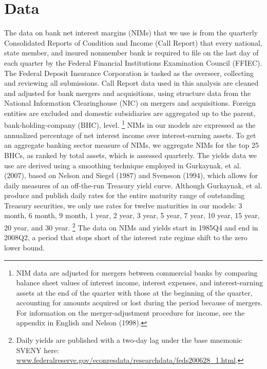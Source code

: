 \documentclass[12pt]{article}
\begin{document}
\section{Data}
The data on bank net interest margins (NIMs) that we use is from the quarterly Consolidated Reports of Condition and Income (Call Report) that every national, state member, and insured nonmember bank is required to file on the last day of each quarter by the Federal Financial Institutions Examination Council (FFIEC). The Federal Deposit Insurance Corporation is tasked as the overseer, collecting and reviewing all submissions. Call Report data used in this analysis are cleaned and adjusted for bank mergers and acquisitions, using structure data from the National Information Clearinghouse (NIC) on mergers and acquisitions. Foreign entities are excluded and domestic subsidiaries are aggregated up to the parent, bank-holding-company (BHC), level. \footnote{NIM data are adjusted for mergers between commercial banks by comparing balance sheet values of interest income, interest expenses, and interest-earning assets at the end of the quarter with those at the beginning of the quarter, accounting for amounts acquired or lost during the period because of mergers. For information on the merger-adjustment procedure for income, see the appendix in English and Nelson (1998).} \newline \newline
NIMs in our models are expressed as the annualized percentage of net interest income over interest-earning assets. To get an aggregate banking sector measure of NIMs, we aggregate NIMs for the top 25 BHCs, as ranked by total assets, which is assessed quarterly. \newline \newline
The yields data we use are derived using a smoothing technique employed in Gurkaynak, et al. (2007), based on Nelson and Siegel (1987) and Svensson (1994), which allows for daily measures of an off-the-run Treasury yield curve. Although Gurkaynak, et al. produce and publish daily rates for the entire maturity range of outstanding Treasury securities, we only use rates for twelve maturities in our models: 3 month, 6 month, 9 month, 1 year, 2 year, 3 year, 5 year, 7 year, 10 year, 15 year, 20 year, and 30 year. \footnote{Daily yields are published with a two-day lag under the base mnemonic SVENY here: \url{www.federalreserve.gov/econresdata/researchdata/feds200628_1.html}.} \newline \newline
The data on NIMs and yields start in 1985Q4 and end in 2008Q2, a period that stops short of the interest rate regime shift to the zero lower bound.
\end{document}
